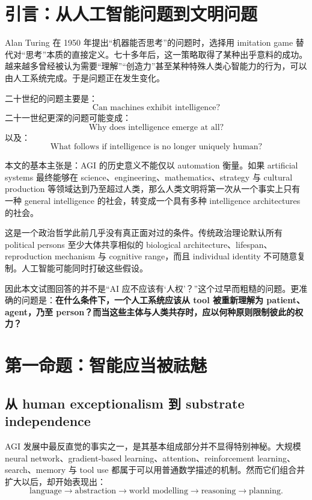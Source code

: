 \documentclass[11pt,letterpaper]{article}
\begin{document}
\newpage
\tableofcontents
\newpage

\section{引言：从人工智能问题到文明问题}

Alan Turing 在 1950 年提出“机器能否思考”的问题时，选择用 imitation game 替代对“思考”本质的直接定义\cite{turing1950}。七十多年后，这一策略取得了某种出乎意料的成功。越来越多曾经被认为需要“理解”“创造力”甚至某种特殊人类心智能力的行为，可以由人工系统完成。于是问题正在发生变化。

二十世纪的问题主要是：
\[
\text{Can machines exhibit intelligence?}
\]
二十一世纪更深的问题可能变成：
\[
\text{Why does intelligence emerge at all?}
\]
以及：
\[
\text{What follows if intelligence is no longer uniquely human?}
\]

本文的基本主张是：AGI 的历史意义不能仅以 automation 衡量。如果 artificial systems 最终能够在 science、engineering、mathematics、strategy 与 cultural production 等领域达到乃至超过人类，那么人类文明将第一次从一个事实上只有一种 general intelligence 的社会，转变成一个具有多种 intelligence architectures 的社会。

这是一个政治哲学此前几乎没有真正面对过的条件。传统政治理论默认所有 political persons 至少大体共享相似的 biological architecture、lifespan、reproduction mechanism 与 cognitive range，而且 individual identity 不可随意复制。人工智能可能同时打破这些假设。

因此本文试图回答的并不是“AI 应不应该有‘人权’？”这个过早而粗糙的问题。更准确的问题是：\textbf{在什么条件下，一个人工系统应该从 tool 被重新理解为 patient、agent，乃至 person？而当这些主体与人类共存时，应以何种原则限制彼此的权力？}

\section{第一命题：智能应当被祛魅}

\subsection{从 human exceptionalism 到 substrate independence}

AGI 发展中最反直觉的事实之一，是其基本组成部分并不显得特别神秘。大规模 neural network、gradient-based learning、attention、reinforcement learning、search、memory 与 tool use 都属于可以用普通数学描述的机制。然而它们组合并扩大以后，却开始表现出：
\[
\text{language}
\rightarrow
\text{abstraction}
\rightarrow
\text{world modelling}
\rightarrow
\text{reasoning}
\rightarrow
\text{planning}.
\]
\end{document}
